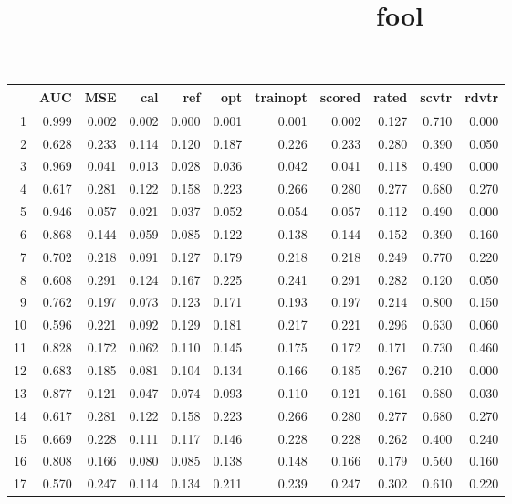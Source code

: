 \documentclass {article}
\begin{document}
 
\title{fool}

 
\tiny

\begin{table}[ht]
\centering
\begingroup\footnotesize
\begin{tabular}{rrrrrrrrrrr}
  \hline
 & AUC & MSE & cal & ref & opt & trainopt & scored & rated & scvtr & rdvtr \\ 
  \hline
1 & 0.999 & 0.002 & 0.002 & 0.000 & 0.001 & 0.001 & 0.002 & 0.127 & 0.710 & 0.000 \\ 
  2 & 0.628 & 0.233 & 0.114 & 0.120 & 0.187 & 0.226 & 0.233 & 0.280 & 0.390 & 0.050 \\ 
  3 & 0.969 & 0.041 & 0.013 & 0.028 & 0.036 & 0.042 & 0.041 & 0.118 & 0.490 & 0.000 \\ 
  4 & 0.617 & 0.281 & 0.122 & 0.158 & 0.223 & 0.266 & 0.280 & 0.277 & 0.680 & 0.270 \\ 
  5 & 0.946 & 0.057 & 0.021 & 0.037 & 0.052 & 0.054 & 0.057 & 0.112 & 0.490 & 0.000 \\ 
  6 & 0.868 & 0.144 & 0.059 & 0.085 & 0.122 & 0.138 & 0.144 & 0.152 & 0.390 & 0.160 \\ 
  7 & 0.702 & 0.218 & 0.091 & 0.127 & 0.179 & 0.218 & 0.218 & 0.249 & 0.770 & 0.220 \\ 
  8 & 0.608 & 0.291 & 0.124 & 0.167 & 0.225 & 0.241 & 0.291 & 0.282 & 0.120 & 0.050 \\ 
  9 & 0.762 & 0.197 & 0.073 & 0.123 & 0.171 & 0.193 & 0.197 & 0.214 & 0.800 & 0.150 \\ 
  10 & 0.596 & 0.221 & 0.092 & 0.129 & 0.181 & 0.217 & 0.221 & 0.296 & 0.630 & 0.060 \\ 
  11 & 0.828 & 0.172 & 0.062 & 0.110 & 0.145 & 0.175 & 0.172 & 0.171 & 0.730 & 0.460 \\ 
  12 & 0.683 & 0.185 & 0.081 & 0.104 & 0.134 & 0.166 & 0.185 & 0.267 & 0.210 & 0.000 \\ 
  13 & 0.877 & 0.121 & 0.047 & 0.074 & 0.093 & 0.110 & 0.121 & 0.161 & 0.680 & 0.030 \\ 
  14 & 0.617 & 0.281 & 0.122 & 0.158 & 0.223 & 0.266 & 0.280 & 0.277 & 0.680 & 0.270 \\ 
  15 & 0.669 & 0.228 & 0.111 & 0.117 & 0.146 & 0.228 & 0.228 & 0.262 & 0.400 & 0.240 \\ 
  16 & 0.808 & 0.166 & 0.080 & 0.085 & 0.138 & 0.148 & 0.166 & 0.179 & 0.560 & 0.160 \\ 
  17 & 0.570 & 0.247 & 0.114 & 0.134 & 0.211 & 0.239 & 0.247 & 0.302 & 0.610 & 0.220 \\ 

\end{tabular}
\end{table}
\end{document}
